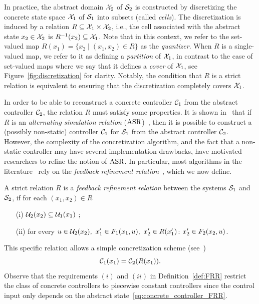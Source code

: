 \documentclass{juliacon}
\begin{document}
\vskip 6pt
In practice, the abstract domain $\mathcal{X}_2$ of $\mathcal{S}_2$ is constructed by discretizing the concrete state space $\mathcal{X}_1$ of $\mathcal{S}_1$ into subsets (called \emph{cells}). The discretization is induced by a relation $R\subseteq \mathcal{X}_1\times \mathcal{X}_2$, i.e., the cell associated with the abstract state $x_2\in\mathcal{X}_2$ is $R^{-1}(x_2)\subseteq \mathcal{X}_1$.
Note that in this context, we refer to the set-valued map $R(x_1) = \{x_2 \mid (x_1, x_2)\in R\}$ as the \emph{quantizer}.
When $R$ is a single-valued map, we refer to it as defining a \emph{partition} of $\mathcal{X}_1$, in contrast to the case of set-valued maps where we say that it defines a \emph{cover} of $\mathcal{X}_1$, see Figure~\ref{fig:discretization} for clarity.
Notably, the condition that $R$ is a strict relation is equivalent to ensuring that the discretization completely covers $\mathcal{X}_1$.

\vskip 6pt

In order to be able to reconstruct a concrete controller $\mathcal{C}_1$ from the abstract controller $\mathcal{C}_2$, the relation $R$ must satisfy some properties. It is shown in~\cite[Theorem 1]{Calbert2024a} that if $R$ is an \emph{alternating simulation relation} ($\operatorname{ASR}$)~\cite[Definition 4.19]{tabuada2009verification}, then it is possible to construct a (possibly non-static) controller $\mathcal{C}_1$ for $\mathcal{S}_1$ from the abstract controller $\mathcal{C}_2$.
%
However, the complexity of the concretization algorithm, and the fact that a non-static controller may have several implementation drawbacks, have motivated researchers to refine the notion of $\operatorname{ASR}$. In particular, most algorithms in the literature~\cite{rungger2016scots,borri2018design,calbert2021alternating} rely on the \emph{feedback refinement relation}~\cite[Def. V.2]{reissig2016feedback}, which we now define.
\begin{defi}\label{def:FRR}
A strict relation $R$ is a \emph{feedback refinement relation} between the systems $\mathcal{S}_1$ and $\mathcal{S}_2$, if for each $(x_1,x_2)\in R$
\begin{enumerate}
    \item[(i)] $\mathcal{U}_2(x_2)\subseteq \mathcal{U}_1(x_1)$ \label{cond:i:FRR};
    \item[(ii)] for every $u \in \mathcal{U}_2(x_2),\ x_1'\in F_1(x_1, u), \ x_2'\in R(x_1')$: $ x_2'\in F_2(x_2, u)$.
\end{enumerate}
\end{defi}

This specific relation allows a simple concretization scheme (see~\cite[V.4 Theorem]{reissig2016feedback})
\begin{equation}\label{eq:concrete_controller_FRR}
    \mathcal{C}_1(x_1) = \mathcal{C}_2(R(x_1)).
\end{equation}
Observe that the requirements $(i)$ and $(ii)$ in Definition~\ref{def:FRR} restrict the class of concrete controllers to piecewise constant controllers since the control input only depends on the abstract state~\eqref{eq:concrete_controller_FRR}. 
\end{document}
